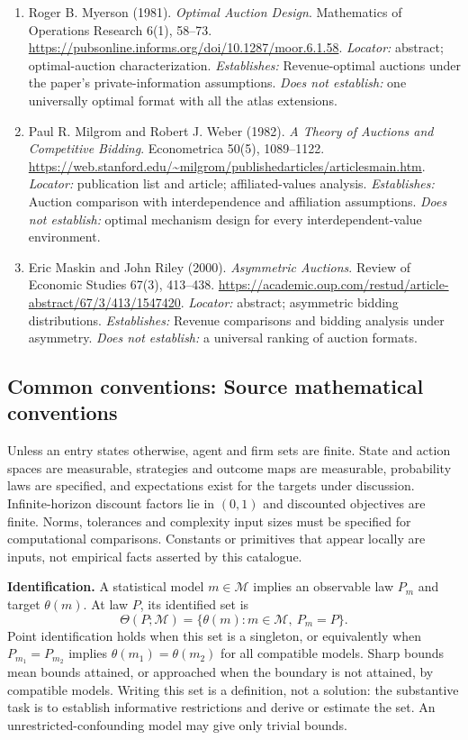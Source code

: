 \documentclass[11pt,a4paper]{article}
\begin{document}
\begin{enumerate}

\item[S1] Roger B. Myerson (1981). \emph{Optimal Auction Design}. Mathematics of Operations Research 6(1), 58--73. \url{https://pubsonline.informs.org/doi/10.1287/moor.6.1.58}. \textit{Locator:} abstract; optimal-auction characterization. \textit{Establishes:} Revenue-optimal auctions under the paper's private-information assumptions. \textit{Does not establish:} one universally optimal format with all the atlas extensions.

\item[S2] Paul R. Milgrom and Robert J. Weber (1982). \emph{A Theory of Auctions and Competitive Bidding}. Econometrica 50(5), 1089--1122. \url{https://web.stanford.edu/~milgrom/publishedarticles/articlesmain.htm}. \textit{Locator:} publication list and article; affiliated-values analysis. \textit{Establishes:} Auction comparison with interdependence and affiliation assumptions. \textit{Does not establish:} optimal mechanism design for every interdependent-value environment.

\item[S3] Eric Maskin and John Riley (2000). \emph{Asymmetric Auctions}. Review of Economic Studies 67(3), 413--438. \url{https://academic.oup.com/restud/article-abstract/67/3/413/1547420}. \textit{Locator:} abstract; asymmetric bidding distributions. \textit{Establishes:} Revenue comparisons and bidding analysis under asymmetry. \textit{Does not establish:} a universal ranking of auction formats.

\end{enumerate}

\subsection*{Common conventions: Source mathematical conventions}

Unless an entry states otherwise, agent and firm sets are finite. State and action spaces are measurable, strategies and outcome maps are measurable, probability laws are specified, and expectations exist for the targets under discussion. Infinite-horizon discount factors lie in $(0,1)$ and discounted objectives are finite. Norms, tolerances and complexity input sizes must be specified for computational comparisons. Constants or primitives that appear locally are inputs, not empirical facts asserted by this catalogue.

\textbf{Identification.} A statistical model $m\in\mathcal M$ implies an observable law $P_m$ and target $\theta(m)$. At law $P$, its identified set is
\[
\Theta(P;\mathcal M)=\{\theta(m):m\in\mathcal M,\ P_m=P\}.
\]
Point identification holds when this set is a singleton, or equivalently when $P_{m_1}=P_{m_2}$ implies $\theta(m_1)=\theta(m_2)$ for all compatible models. Sharp bounds mean bounds attained, or approached when the boundary is not attained, by compatible models. Writing this set is a definition, not a solution: the substantive task is to establish informative restrictions and derive or estimate the set. An unrestricted-confounding model may give only trivial bounds.
\end{document}
